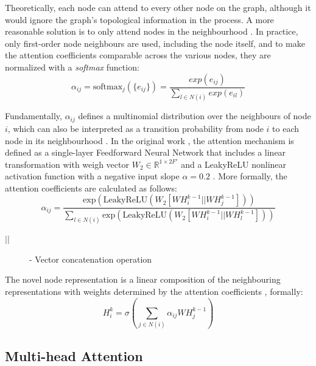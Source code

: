 Theoretically, each node can attend to every other node on the graph, although it would ignore the graph's topological information in the process. A more reasonable solution is to only attend nodes in the neighbourhood \cite{velickovicGraphAttentionNetworks2018, tangGraphNeuralNetworks2022}. In practice, only first-order node neighbours are used, including the node itself, and to make the attention coefficients comparable across the various nodes, they are normalized with a \textit{softmax} function:
$$ \alpha_{ij} = \text{softmax}_j(\{e_{ij}\}) = \frac{exp(e_{ij})}{\sum_{l \in N(i)} exp(e_{il})}$$

Fundamentally, $\alpha_{ij}$ defines a multinomial distribution over the neighbours of node $i$, which can also be interpreted as a transition probability from node $i$ to each node in its neighbourhood \cite{tangGraphNeuralNetworks2022}. 
In the original work \cite{velickovicGraphAttentionNetworks2018}, the attention mechanism is defined as a single-layer Feedforward Neural Network that includes a linear transformation with weigh vector $W_2 \in \mathbb{R}^{1 \times 2 F'}$ and a LeakyReLU nonlinear activation function with a negative input slope $\alpha = 0.2$ \cite{tangGraphNeuralNetworks2022, velickovicGraphAttentionNetworks2018}. More formally, the attention coefficients are calculated as follows:
\begin{equation}
	\alpha_{ij} = \frac{ \text{exp}( \text{LeakyReLU}( W_2 [W H^{k - 1}_i || W H^{k - 1}_j]))}{ \sum_{l \in N(i)} \text{exp}( \text{LeakyReLU}( W_2 [W H^{k - 1}_i || W H^{k - 1}_l])) }
\end{equation}

\begin{description}
	\item[$||$] - Vector concatenation operation
\end{description}

The novel node representation is a linear composition of the neighbouring representations with weights determined by the attention coefficients \cite{velickovicGraphAttentionNetworks2018, tangGraphNeuralNetworks2022}, formally:
\begin{equation}
	H^k_i = \sigma(\sum_{j \in N(i)} \alpha_{ij} W H^{k - 1}_j) 
\end{equation}


\subsection*{Multi-head Attention}

